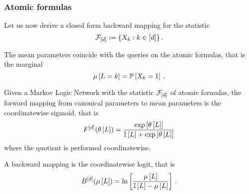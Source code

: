 \subsubsection{Atomic formulas}

Let us now derive a closed form backward mapping for the statistic
	\[ \mathcal{F}_{[d]} := \{X_{k}: k\in[d]\} \, . \]

The mean parameters coincide with the queries on the atomic formulas, that is the marginal 
	\[ \mu\left[L=k\right] = \mathbb{P}\left[X_{k}=1\right]  \, . \]

\begin{theorem}
	Given a Markov Logic Network with the statistic $\mathcal{F}_{[d]}$ of atomic formulas, the forward mapping from canonical parameters to mean parameters is the coordinatewise sigmoid, that is
		\[ F^{[d]}(\theta\left[L\right]) = \frac{\mathrm{exp}\left[\theta\left[L\right]\right]}{\mathbb{I}\left[L\right]+\mathrm{exp}\left[\theta\left[L\right]\right]}   \]
	where the quotient is performed coordinatewise.

	A backward mapping is the coordinatewise logit, that is
		\[ B^{[d]}(\mu\left[L\right]) 
		= \ln \left[ \frac{
			\mu\left[L\right]
			}{
			\mathbb{I}\left[L\right]-\mu\left[L\right]
			} \right]  \, . \]
\end{theorem}
